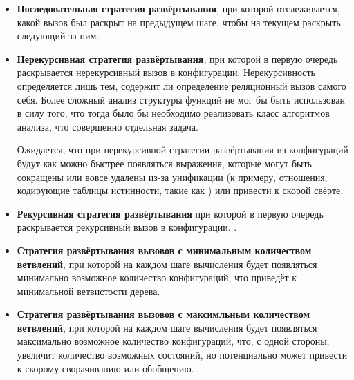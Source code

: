 \begin{itemize}
\item {\bf Последовательная стратегия развёртывания}, при которой отслеживается,
      какой вызов был раскрыт на предыдущем шаге, чтобы на текущем
      раскрыть следующий за ним. 

\item {\bf Нерекурсивная стратегия развёртывания}, при которой в первую очередь
      раскрывается нерекурсивный вызов в конфигурации. Нерекурсивность определяется
      лишь тем, содержит ли определение реляционный вызов самого себя. Более сложный
      анализ структуры функций не мог бы быть использован в силу того, что тогда
      было бы необходимо реализовать класс алгоритмов анализа, что совершенно отдельная задача.

      Ожидается, что при нерекурсивной стратегии развёртывания из конфигураций
      будут как можно быстрее появляться выражения, которые могут быть сокращены
      или вовсе удалены из-за унификации (к примеру, отношения, кодирующие
      таблицы истинности, такие как ) или привести к скорой свёрте.

\item {\bf Рекурсивная стратегия развёртывания} при которой в первую очередь
      раскрывается рекурсивный вызов в конфигурации. .

\item {\bf Стратегия развёртывания вызовов с минимальным количеством ветвлений},
      при которой на каждом шаге вычисления будет появляться минимально возможное количество
      конфигураций, что приведёт к минимальной ветвистости дерева.

\item {\bf Стратегия развёртывания вызовов с максимльным количеством ветвлений},
      при которой на каждом шаге вычисления будет появляться максимально возможное количество
      конфигураций, что, с одной стороны, увеличит количество возможных состояний, но
      потенциально может привести к скорому сворачиванию или обобщению. 
\end{itemize}


